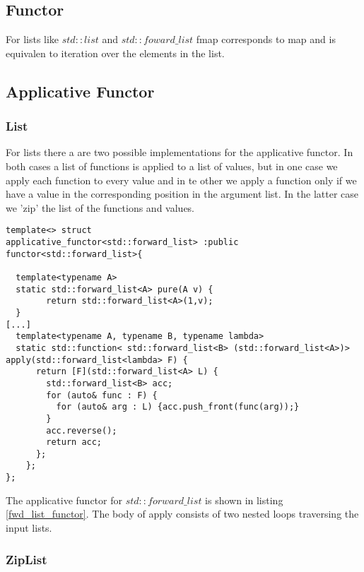\documentclass[12pt,fleqn]{article}
\begin{document}
\subsection{Functor}

For lists like $std::list$ and $std::foward\_list$ fmap corresponds to map and is equivalen to iteration over the elements in the list.

  
%
%
\subsection{Applicative Functor}
%
%

\subsubsection{List}
%
For lists there a are two possible implementations for the applicative functor.
In both cases a list of functions is applied to a list of values, but in one case we apply each function to every value and in te other we apply a function 
only if we have a value in the corresponding position in the argument list. 
In the latter case we 'zip' the list of the functions and values.

%
%
\begin{minipage}{\linewidth}
\begin{lstlisting}[caption=std::forward\_list is an applicative functor, label=fwd_list_functor]
template<> struct 
applicative_functor<std::forward_list> :public functor<std::forward_list>{

  template<typename A>
  static std::forward_list<A> pure(A v) {
		return std::forward_list<A>(1,v);
  }
[...]
  template<typename A, typename B, typename lambda>
  static std::function< std::forward_list<B> (std::forward_list<A>)> apply(std::forward_list<lambda> F) {
      return [F](std::forward_list<A> L) {
	    std::forward_list<B> acc;
	    for (auto& func : F) {
	      for (auto& arg : L) {acc.push_front(func(arg));}
        } 
	    acc.reverse();
	    return acc;
      };
    };
};
\end{lstlisting}
\end{minipage}
%
%
%
The applicative functor for $std::forward\_list$ is shown in listing \ref{fwd_list_functor}.
The body of apply consists of two nested loops traversing the input lists. 
%
\subsubsection{ZipList}
%   
\end{document}
